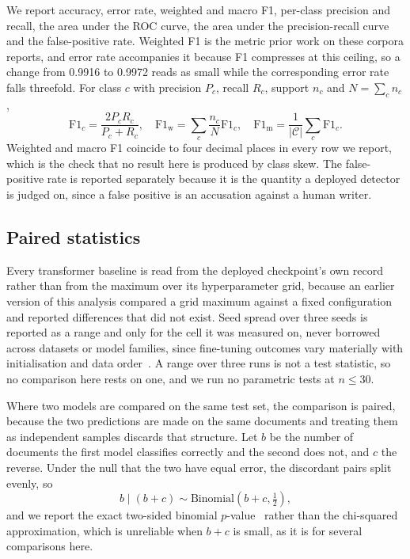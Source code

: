 \documentclass[conference,a4paper]{IEEEtran}
\begin{document}
We report accuracy, error rate, weighted and macro F1, per-class precision and recall, the area under the ROC curve, the area under the precision-recall curve and the false-positive rate. Weighted F1 is the metric prior work on these corpora reports, and error rate accompanies it because F1 compresses at this ceiling, so a change from 0.9916 to 0.9972 reads as small while the corresponding error rate falls threefold. For class $c$ with precision $P_c$, recall $R_c$, support $n_c$ and $N=\sum_c n_c$,
\begin{equation}
\label{eq:f1}
\mathrm{F1}_c = \frac{2 P_c R_c}{P_c + R_c}, \quad
\mathrm{F1}_{\mathrm{w}} = \sum_c \frac{n_c}{N}\mathrm{F1}_c, \quad
\mathrm{F1}_{\mathrm{m}} = \frac{1}{|\mathcal{C}|}\sum_c \mathrm{F1}_c .
\end{equation}
Weighted and macro F1 coincide to four decimal places in every row we report, which is the check that no result here is produced by class skew. The false-positive rate is reported separately because it is the quantity a deployed detector is judged on, since a false positive is an accusation against a human writer.

\subsection{Paired statistics}
\label{sec:stats}

Every transformer baseline is read from the deployed checkpoint's own record rather than from the maximum over its hyperparameter grid, because an earlier version of this analysis compared a grid maximum against a fixed configuration and reported differences that did not exist. Seed spread over three seeds is reported as a range and only for the cell it was measured on, never borrowed across datasets or model families, since fine-tuning outcomes vary materially with initialisation and data order~\cite{Dodge2020fine,Mosbach2020stability}. A range over three runs is not a test statistic, so no comparison here rests on one, and we run no parametric tests at $n \le 30$.

Where two models are compared on the same test set, the comparison is paired, because the two predictions are made on the same documents and treating them as independent samples discards that structure. Let $b$ be the number of documents the first model classifies correctly and the second does not, and $c$ the reverse. Under the null that the two have equal error, the discordant pairs split evenly, so
\begin{equation}
\label{eq:mcnemar}
b \mid (b+c)  \sim  \mathrm{Binomial}\!\left(b+c, \tfrac{1}{2}\right),
\end{equation}
and we report the exact two-sided binomial $p$-value~\cite{McNemar1947note} rather than the chi-squared approximation, which is unreliable when $b+c$ is small, as it is for several comparisons here.
\end{document}
